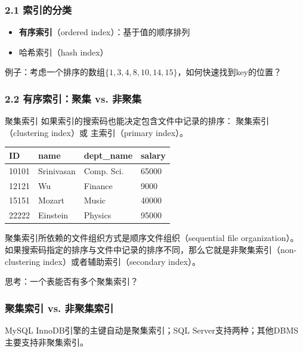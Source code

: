 \documentclass[aspectratio=169, 14pt]{beamer}
\begin{document}
\begin{frame}
	\frametitle{2.1 索引的分类}
	\begin{itemize}
		\item \textbf{有序索引}（ordered index）：基于值的顺序排列
		\item 哈希索引（hash index）
	\end{itemize}

	\noindent\makebox[\linewidth]{\rule{\paperwidth}{0.4pt}}

	例子：考虑一个排序的数组$\{1, 3, 4, 8, 10, 14, 15\}$，如何快速找到key的位置？

\end{frame}

\begin{frame}
	\frametitle{2.2 有序索引：聚集 vs. 非聚集}
	\begin{exampleblock}{聚集索引}
		如果索引的搜索码也能决定包含文件中记录的排序： \alert{聚集索引}（clustering index）或 主索引（primary index）。
	\end{exampleblock}

	\begin{table}
		\begin{tabular}{llll}
			\toprule
			ID    & name       & dept\_name & salary \\
			\midrule
			10101 & Srinivasan & Comp. Sci. & 65000  \\
			12121 & Wu         & Finance    & 9000   \\
			15151 & Mozart     & Music      & 40000  \\
			22222 & Einstein   & Physics    & 95000  \\
			\bottomrule
		\end{tabular}
	\end{table}
\end{frame}

\begin{frame}
	聚集索引所依赖的文件组织方式是\alert{顺序文件组织}（sequential file organization）。
	\noindent\makebox[\linewidth]{\rule{\paperwidth}{0.4pt}}
	如果搜索码指定的排序与文件中记录的排序不同，那么它就是非聚集索引（non-clustering index）或者辅助索引（secondary index）。

	 思考：一个表能否有多个聚集索引？
\end{frame}

\begin{frame}[fragile]
	\frametitle{聚集索引 vs. 非聚集索引}

	MySQL InnoDB引擎的主键自动是聚集索引；SQL Server支持两种；其他DBMS主要支持非聚集索引。

\end{frame}
\end{document}
